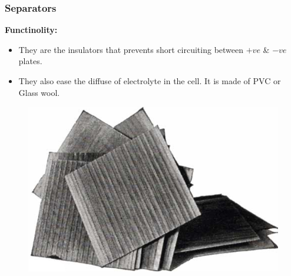 \documentclass{beamer}
\begin{document}
\begin{frame}    %
  \frametitle{Separators}
  \fontsize{8pt}{12}\selectfont
    
  \textbf{Functinolity:}
  \begin{itemize}
    \item They are the insulators that prevents short circuiting between $+ve$ \& $-ve$ plates.
    \item They also ease the diffuse of electrolyte in the cell. It is made of PVC or Glass wool.
  \end{itemize}
  
  \begin{figure}
    \includegraphics[width=0.6\linewidth]{./Resources/Images/separators.png}
  \end{figure}
\end{frame}
\end{document}
